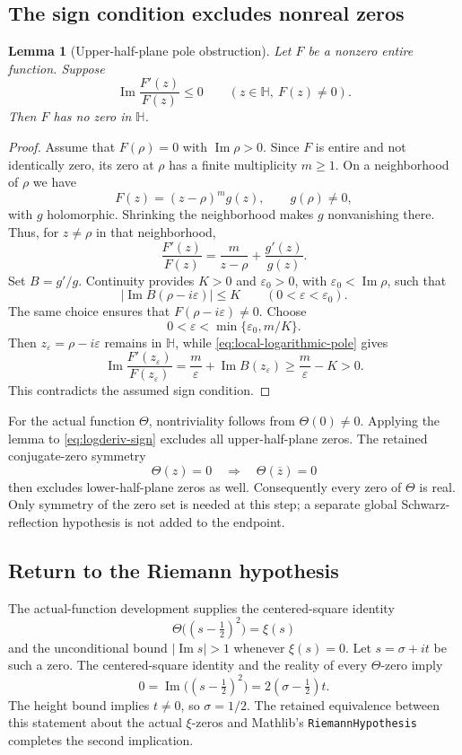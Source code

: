 \documentclass[11pt,a4paper]{article}
\newtheorem{lemma}[theorem]{Lemma}
\theoremstyle{definition}
\numberwithin{equation}{section}
\begin{document}
\subsection{The sign condition excludes nonreal zeros}
\begin{lemma}[Upper-half-plane pole obstruction]
Let $F$ be a nonzero entire function. Suppose
\[
 \operatorname{Im}\frac{F'(z)}{F(z)}\leq0
 \qquad(z\in\mathbb H,\ F(z)\ne0).
\]
Then $F$ has no zero in $\mathbb H$.
\end{lemma}
\begin{proof}
Assume that $F(\rho)=0$ with $\operatorname{Im}\rho>0$. Since $F$ is entire and not identically zero, its zero at $\rho$ has a finite multiplicity $m\geq1$. On a neighborhood of $\rho$ we have
\[
 F(z)=(z-\rho)^m g(z),\qquad g(\rho)\ne0,
\]
with $g$ holomorphic. Shrinking the neighborhood makes $g$ nonvanishing there. Thus, for $z\ne\rho$ in that neighborhood,
\begin{equation}
 \frac{F'(z)}{F(z)}=\frac{m}{z-\rho}+\frac{g'(z)}{g(z)}.
 \label{eq:local-logarithmic-pole}
\end{equation}
Set $B=g'/g$. Continuity provides $K>0$ and $\varepsilon_0>0$, with $\varepsilon_0<\operatorname{Im}\rho$, such that
\[
 \bigl|\operatorname{Im}B(\rho-i\varepsilon)\bigr|\leq K
 \qquad(0<\varepsilon<\varepsilon_0).
\]
The same choice ensures that $F(\rho-i\varepsilon)\ne0$. Choose
\[
 0<\varepsilon<\min\{\varepsilon_0,m/K\}.
\]
Then $z_\varepsilon=\rho-i\varepsilon$ remains in $\mathbb H$, while \eqref{eq:local-logarithmic-pole} gives
\[
 \operatorname{Im}\frac{F'(z_\varepsilon)}{F(z_\varepsilon)}
 =\frac{m}{\varepsilon}+\operatorname{Im}B(z_\varepsilon)
 \geq\frac{m}{\varepsilon}-K>0.
\]
This contradicts the assumed sign condition.
\end{proof}

For the actual function $\Theta$, nontriviality follows from $\Theta(0)\ne0$. Applying the lemma to \eqref{eq:logderiv-sign} excludes all upper-half-plane zeros. The retained conjugate-zero symmetry
\[
 \Theta(z)=0\quad\Longrightarrow\quad\Theta(\overline z)=0
\]
then excludes lower-half-plane zeros as well. Consequently every zero of $\Theta$ is real. Only symmetry of the zero set is needed at this step; a separate global Schwarz-reflection hypothesis is not added to the endpoint.

\subsection{Return to the Riemann hypothesis}
The actual-function development supplies the centered-square identity
\[
 \Theta\bigl((s-\tfrac12)^2\bigr)=\xi(s)
\]
and the unconditional bound $|\operatorname{Im}s|>1$ whenever $\xi(s)=0$. Let $s=\sigma+it$ be such a zero. The centered-square identity and the reality of every $\Theta$-zero imply
\[
 0=\operatorname{Im}\bigl((s-\tfrac12)^2\bigr)
   =2(\sigma-\tfrac12)t.
\]
The height bound implies $t\ne0$, so $\sigma=1/2$. The retained equivalence between this statement about the actual $\xi$-zeros and Mathlib's \texttt{RiemannHypothesis} completes the second implication.
\end{document}
